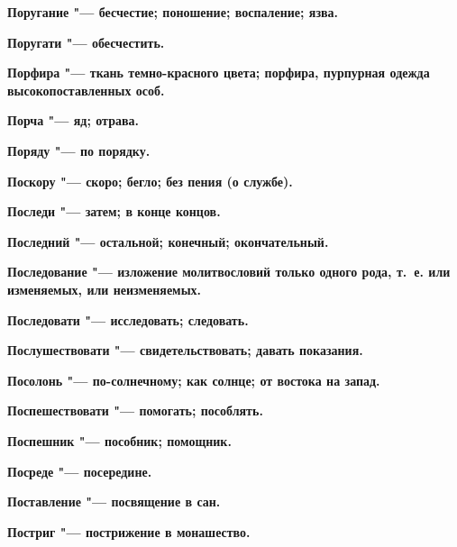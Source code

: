 \begin{multicols}{2}
\bfseries Поругание\normalfont{} "--- бесчестие; поношение; воспаление; язва. 




\bfseries Поругати\normalfont{} "--- обесчестить. 




\bfseries Порфира\normalfont{} "--- ткань темно-красного цвета; порфира, пурпурная одежда высокопоставленных особ. 




\bfseries Порча\normalfont{} "--- яд; отрава. 




\bfseries Поряду\normalfont{} "--- по порядку. 




\bfseries Поскору\normalfont{} "--- скоро; бегло; без пения (о службе). 




\bfseries Последи\normalfont{} "--- затем; в конце концов. 




\bfseries Последний\normalfont{} "--- остальной; конечный; окончательный. 




\bfseries Последование\normalfont{} "--- изложение молитвословий только одного рода, т.~е. или изменяемых, или неизменяемых. 




\bfseries Последовати\normalfont{} "--- исследовать; следовать. 




\bfseries Послушествовати\normalfont{} "--- свидетельствовать; давать показания. 




\bfseries Посолонь\normalfont{} "--- по-солнечному; как солнце; от востока на запад. 




\bfseries Поспешествовати\normalfont{} "--- помогать; пособлять. 




\bfseries Поспешник\normalfont{} "--- пособник; помощник. 




\bfseries Посреде\normalfont{} "--- посередине. 




\bfseries Поставление\normalfont{} "--- посвящение в сан. 




\bfseries Постриг\normalfont{} "--- пострижение в монашество. 





\end{multicols}
